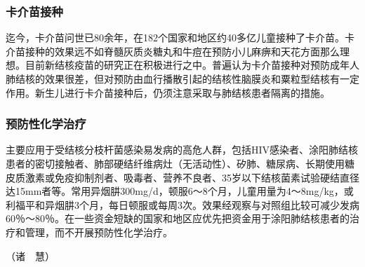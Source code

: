 \subsubsection{卡介苗接种}

迄今，卡介苗问世已80余年，在182个国家和地区约40多亿儿童接种了卡介苗。卡介苗接种的效果远不如脊髓灰质炎糖丸和牛痘在预防小儿麻痹和天花方面那么理想。目前新结核疫苗的研究正在积极进行之中。普遍认为卡介苗接种对预防成年人肺结核的效果很差，但对预防由血行播散引起的结核性脑膜炎和粟粒型结核有一定作用。新生儿进行卡介苗接种后，仍须注意采取与肺结核患者隔离的措施。

\subsubsection{预防性化学治疗}

主要应用于受结核分枝杆菌感染易发病的高危人群，包括HIV感染者、涂阳肺结核患者的密切接触者、肺部硬结纤维病灶（无活动性）、矽肺、糖尿病、长期使用糖皮质激素或免疫抑制剂者、吸毒者、营养不良者、35岁以下结核菌素试验硬结直径达15mm者等。常用异烟肼300mg/d，顿服6～8个月，儿童用量为4～8mg/kg，或利福平和异烟肼3个月，每日顿服或每周3次。效果经观察与对照组比较可减少发病60％～80％。在一些资金短缺的国家和地区应优先把资金用于涂阳肺结核患者的治疗和管理，而不开展预防性化学治疗。

（诸　慧）

\protect\hypertarget{text00020.html}{}{}

